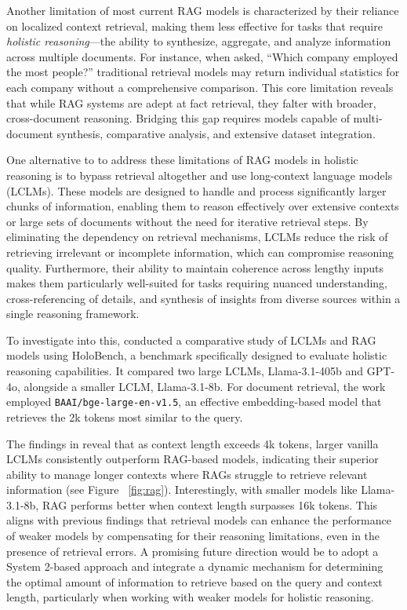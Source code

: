 Another limitation of most current RAG models is characterized by their reliance on localized context retrieval, making them less effective for tasks that require \textit{holistic reasoning}—the ability to synthesize, aggregate, and analyze information across multiple documents. For instance, when asked, ``Which company employed the most people?'' traditional retrieval models may return individual statistics for each company without a comprehensive comparison. This core limitation reveals that while RAG systems are adept at fact retrieval, they falter with broader, cross-document reasoning. Bridging this gap requires models capable of multi-document synthesis, comparative analysis, and extensive dataset integration.

One alternative to to address these limitations of RAG models in holistic reasoning is to bypass retrieval altogether and use long-context language models (LCLMs).  These models are designed to handle and process significantly larger chunks of information, enabling them to reason effectively over extensive contexts or large sets of documents without the need for iterative retrieval steps. By eliminating the dependency on retrieval mechanisms, LCLMs reduce the risk of retrieving irrelevant or incomplete information, which can compromise reasoning quality. Furthermore, their ability to maintain coherence across lengthy inputs makes them particularly well-suited for tasks requiring nuanced understanding, cross-referencing of details, and synthesis of insights from diverse sources within a single reasoning framework.

To investigate into this, \cite{maekawa2024holistic} conducted a comparative study of LCLMs and RAG models using HoloBench, a benchmark specifically designed to evaluate holistic reasoning capabilities. It compared two large LCLMs, Llama-3.1-405b and GPT-4o, alongside a smaller LCLM, Llama-3.1-8b. For document retrieval, the work employed \texttt{\small BAAI/bge-large-en-v1.5}, an effective embedding-based model that retrieves the 2k tokens most similar to the query.

The findings in \cite{maekawa2024holistic}  reveal that as context length exceeds 4k tokens, larger vanilla LCLMs consistently outperform RAG-based models, indicating their superior ability to manage longer contexts where RAGs struggle to retrieve relevant information (see Figure ~\ref{fig:rag}). Interestingly, with smaller models like Llama-3.1-8b, RAG performs better when context length surpasses 16k tokens. This aligns with previous findings\cite{maekawa-etal-2024-retrieval} that retrieval models can enhance the performance of weaker models by compensating for their reasoning limitations, even in the presence of retrieval errors. A promising future direction would be to adopt a System 2-based approach and integrate a dynamic mechanism for determining the optimal amount of information to retrieve based on the query and context length, particularly when working with weaker models for holistic reasoning.


